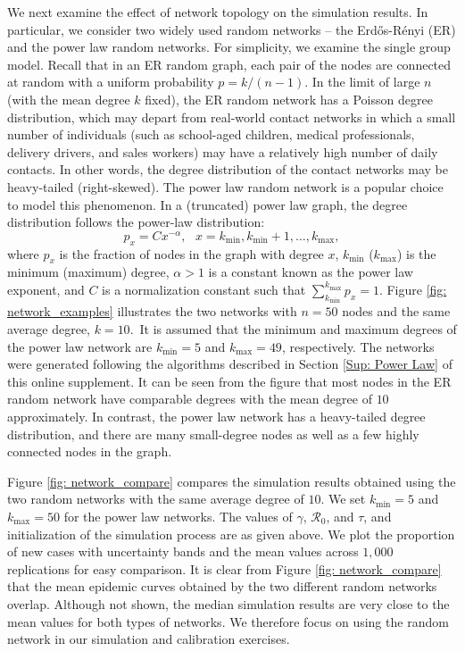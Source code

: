 \documentclass[12pt]{article}
\begin{document}
We next examine the effect of network topology on the simulation results. In
particular, we consider two widely used random networks -- the Erd\H
{o}s-R\'{e}nyi (ER) and the power law random networks. For simplicity, we
examine the single group model. Recall that in an ER random graph, each pair
of the nodes are connected at random with a uniform probability $p=k/\left(
n-1\right)  $. In the limit of large $n$ (with the mean degree $k$ fixed), the
ER random network has a Poisson degree distribution, which may depart from
real-world contact networks in which a small number of individuals (such as
school-aged children, medical professionals, delivery drivers, and sales
workers) may have a relatively high number of daily contacts. In other words,
the degree distribution of the contact networks may be heavy-tailed
(right-skewed). The power law random network is a popular choice to model this
phenomenon. In a (truncated) power law graph, the degree distribution follows
the power-law distribution:
\begin{equation}
p_{x}=Cx^{-\alpha},\text{ \ \ }x=k_{\min},k_{\min}+1,\ldots,k_{\max
},\label{dist_power_law}%
\end{equation}
where $p_{x}$ is the fraction of nodes in the graph with degree $x$, $k_{\min
}$ ($k_{\max}$) is the minimum (maximum) degree, $\alpha>1$ is a constant
known as the power law exponent, and $C$ is a normalization constant such that
$\sum_{k_{\min}}^{k_{\max}}p_{x}=1$. Figure \ref{fig: network_examples}
illustrates the two networks with $n=50$ nodes and the same average degree,
$k=10$.\ It is assumed that the minimum and maximum degrees of the power law
network are $k_{\min}=5$ and $k_{\max}=49$, respectively. The networks were
generated following the algorithms described in Section \ref{Sup: Power Law}
of this online supplement. It can be seen from the figure that most nodes in
the ER random network have comparable degrees with the mean degree of $10$
approximately. In contrast, the power law network has a heavy-tailed degree
distribution, and there are many small-degree nodes as well as a few highly
connected nodes in the graph.

Figure \ref{fig: network_compare} compares the simulation results obtained
using the two random networks with the same average degree of $10$. We set
$k_{\min}=5$ and $k_{\max}=50$ for the power law networks. The values of
$\gamma$, $\mathcal{R}_{0}$, and $\tau$, and initialization of the simulation
process are as given above. We plot the proportion of new cases with
uncertainty bands and the mean values across $1,000$ replications for easy
comparison. It is clear from Figure \ref{fig: network_compare} that the mean
epidemic curves obtained by the two different random networks overlap.
Although not shown, the median simulation results are very close to the mean
values for both types of networks. We therefore focus on using the random
network in our simulation and calibration exercises.%
\end{document}

